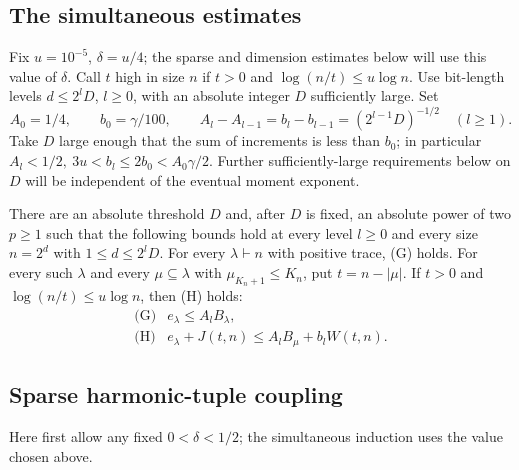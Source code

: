\subsection{The simultaneous estimates}


Fix \(u=10^{-5}\), \(\delta=u/4\); the sparse and dimension estimates below will use this value of \(\delta\). Call \(t\) high in size \(n\) if \(t>0\) and \(\log(n/t)\le u\log n\). Use bit-length levels \(d\le 2^l D\), \(l\ge0\), with an absolute integer \(D\) sufficiently large. Set
\[
 A_0=1/4,\qquad b_0=\gamma/100,\qquad
 A_l-A_{l-1}=b_l-b_{l-1}=(2^{l-1}D)^{-1/2}\quad(l\ge1).
\]
Take \(D\) large enough that the sum of increments is less than \(b_0\); in particular \(A_l<1/2,\ 3u<b_l\le 2b_0<A_0\gamma/2\). Further sufficiently-large requirements below on \(D\) will be independent of the eventual moment exponent.

\begin{proposition}
\label{ten:simultaneous:main}
There are an absolute threshold \(D\) and, after \(D\) is fixed, an
absolute power of two \(p\ge1\) such that the following bounds hold
at every level \(l\ge0\) and every size \(n=2^d\) with \(1\le d\le2^lD\).
For every \(\lambda\vdash n\) with positive trace, (G) holds. For every
such \(\lambda\) and every \(\mu\subseteq\lambda\) with \(\mu_{K_n+1}\le K_n\),
put \(t=n-|\mu|\). If \(t>0\) and \(\log(n/t)\le u\log n\), then (H) holds:
\begin{equation}
 \begin{array}{ll}
 \text{(G)} & e_\lambda\le A_l B_\lambda,\\
 \text{(H)} & e_\lambda+J(t,n)\le A_l B_\mu+b_l W(t,n).
 \end{array}                                                         \label{ten:simultaneous:eq:8}
\end{equation}
\end{proposition}

\subsection{Sparse harmonic-tuple coupling}
Here first allow any fixed $0<\delta<1/2$; the simultaneous induction
uses the value chosen above.

